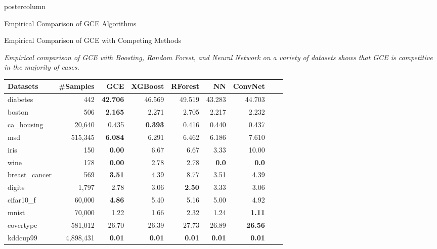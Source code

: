 \documentclass{beamer}
\begin{document}
\begin{frame}
\begin{columns}
\begin{column}{.37\textwidth}
\begin{beamercolorbox}[center]{postercolumn}
\begin{minipage}{.98\textwidth}
{\begin{myblock}{Empirical Comparison of GCE Algorithms}
\end{myblock}\vfill

\vspace{-0.2ex}
\begin{myblock}{Empirical Comparison of GCE with Competing Methods}

\begin{minipage}{0.23\textwidth}
\RaggedRight
\emph{Empirical comparison of GCE with Boosting, Random Forest, and Neural Network on a variety of datasets shows that GCE is competitive in the majority of cases.}
\end{minipage}
\begin{minipage}{0.76\textwidth}
\small{
\begin{table}[H]
\centering
\begin{tabular}[t]{lrrrrrrrr} 
\toprule
\textbf{Datasets} & \#\textbf{Samples} & \textbf{GCE} & \textbf{XGBoost} & \textbf{RForest} & \textbf{NN} & \textbf{ConvNet} \\
\midrule
diabetes & 442 & \textbf{42.706} & 46.569 & 49.519 & 43.283 & 44.703 \\
boston & 506 & \textbf{2.165} & 2.271 & 2.705 & 2.217 & 2.232 \\
ca\_housing &20,640& 0.435 & \textbf{0.393} & 0.416 & 0.440 & 0.437  \\
msd & 515,345& \textbf{6.084} & 6.291 & 6.462 & 6.186 & 7.610 \\
\midrule
iris & 150 & \textbf{0.00} & 6.67 & 6.67 & 3.33 & 10.00  \\
wine & 178 & \textbf{0.00} & 2.78 & 2.78 & \textbf{0.0} & \textbf{0.0}  \\
breast\_cancer & 569 & \textbf{3.51} & 4.39 & 8.77 & 3.51 & 4.39 \\
digits & 1,797 & 2.78 & 3.06 & \textbf{2.50} & 3.33 & 3.06 \\
cifar10\_f & 60,000 & \textbf{4.86} & 5.40 & 5.16 & 5.00 & 4.92 \\
mnist & 70,000 & 1.22 & 1.66 & 2.32 & 1.24 & \textbf{1.11} \\
covertype & 581,012 & 26.70 & 26.39 & 27.73 & 26.89 & \textbf{26.56} \\
kddcup99 & 4,898,431 & \textbf{0.01} & \textbf{0.01} & \textbf{0.01} & \textbf{0.01} & \textbf{0.01}\\
\bottomrule
\end{tabular}
\end{table}
}
\end{minipage}

\end{myblock}\vfill

}
\end{minipage}
\end{beamercolorbox}
\end{column}
\end{columns}
\end{frame}
\end{document}
